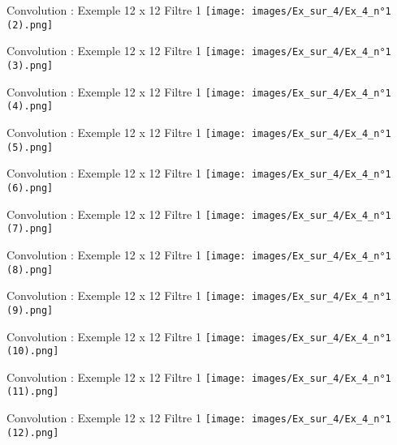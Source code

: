 \documentclass{beamer}
\begin{document}
\begin{frame}{Convolution : Exemple 12 x 12 Filtre 1}
    \texttt{[image: images/Ex\_sur\_4/Ex\_4\_n°1 (2).png]}
\end{frame}

\begin{frame}{Convolution : Exemple 12 x 12 Filtre 1}
    \texttt{[image: images/Ex\_sur\_4/Ex\_4\_n°1 (3).png]}
\end{frame}

\begin{frame}{Convolution : Exemple 12 x 12 Filtre 1}
    \texttt{[image: images/Ex\_sur\_4/Ex\_4\_n°1 (4).png]}
\end{frame}

\begin{frame}{Convolution : Exemple 12 x 12 Filtre 1}
    \texttt{[image: images/Ex\_sur\_4/Ex\_4\_n°1 (5).png]}
\end{frame}

\begin{frame}{Convolution : Exemple 12 x 12 Filtre 1}
    \texttt{[image: images/Ex\_sur\_4/Ex\_4\_n°1 (6).png]}
\end{frame}

\begin{frame}{Convolution : Exemple 12 x 12 Filtre 1}
    \texttt{[image: images/Ex\_sur\_4/Ex\_4\_n°1 (7).png]}
\end{frame}

\begin{frame}{Convolution : Exemple 12 x 12 Filtre 1}
    \texttt{[image: images/Ex\_sur\_4/Ex\_4\_n°1 (8).png]}
\end{frame}

\begin{frame}{Convolution : Exemple 12 x 12 Filtre 1}
    \texttt{[image: images/Ex\_sur\_4/Ex\_4\_n°1 (9).png]}
\end{frame}

\begin{frame}{Convolution : Exemple 12 x 12 Filtre 1}
    \texttt{[image: images/Ex\_sur\_4/Ex\_4\_n°1 (10).png]}
\end{frame}

\begin{frame}{Convolution : Exemple 12 x 12 Filtre 1}
    \texttt{[image: images/Ex\_sur\_4/Ex\_4\_n°1 (11).png]}
\end{frame}

\begin{frame}{Convolution : Exemple 12 x 12 Filtre 1}
    \texttt{[image: images/Ex\_sur\_4/Ex\_4\_n°1 (12).png]}
\end{frame}
\end{document}

